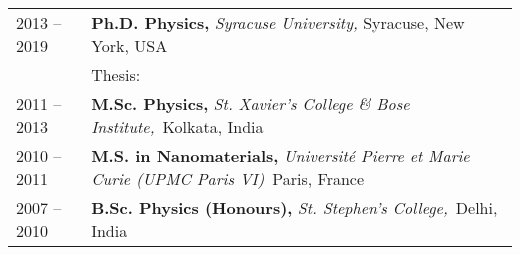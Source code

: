 


\begin{longtable}{R{2.5cm}|p{14.8cm}}
 	\textsc{2013 -- 2019} &\textbf{Ph.D. Physics, } \emph{Syracuse University,} Syracuse, New York, USA\\ 
& Thesis:  \\ %
	\textsc{2011 -- 2013} & \textbf{M.Sc. Physics, }\emph{St. Xavier's College \& Bose Institute,}{~Kolkata, }{India} \\
\textsc{2010 -- 2011} &\textbf{M.S. in Nanomaterials, }\emph{Universit\'{e} Pierre et Marie Curie (UPMC Paris VI)}{~Paris, }{France} \\
\textsc{2007 -- 2010} & \textbf{B.Sc. Physics (Honours),} \emph{St. Stephen's College,}{~Delhi, }{India} \\	
\end{longtable}
